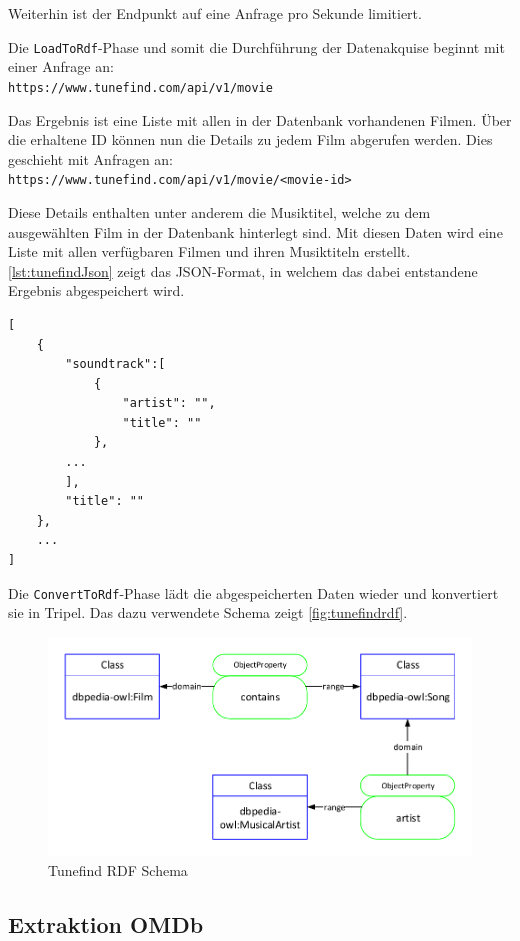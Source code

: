 \documentclass[parskip]{scrartcl}
\begin{document}
Weiterhin ist der Endpunkt auf eine Anfrage pro Sekunde limitiert.

Die \texttt{LoadToRdf}-Phase und somit die Durchführung der Datenakquise beginnt mit einer Anfrage an:\\
\texttt{https://www.tunefind.com/api/v1/movie}

Das Ergebnis ist eine Liste mit allen in der Datenbank vorhandenen Filmen. Über die erhaltene ID können nun die Details zu jedem Film abgerufen werden. Dies geschieht mit Anfragen an:\\
\texttt{https://www.tunefind.com/api/v1/movie/<movie-id>}

Diese Details enthalten unter anderem die Musiktitel, welche zu dem ausgewählten Film in der Datenbank hinterlegt sind.
Mit diesen Daten wird eine Liste mit allen verfügbaren Filmen und ihren Musiktiteln erstellt. \autoref{lst:tunefindJson} zeigt das JSON-Format, in welchem das dabei entstandene Ergebnis abgespeichert wird.

\begin{lstlisting}[caption={Tunefind JSON-Format}, label={lst:tunefindJson}]
[  
    {  
        "soundtrack":[  
            {
                "artist": "",
                "title": ""
            },
        ...
        ],
        "title": ""
    },
    ...
]
\end{lstlisting}

Die \texttt{ConvertToRdf}-Phase lädt die abgespeicherten Daten wieder und konvertiert sie in Tripel. Das dazu verwendete Schema zeigt \autoref{fig:tunefindrdf}.

\begin{figure}[H]
    \centering
    \caption{Tunefind RDF Schema}
    \label{fig:tunefindrdf}
    \includegraphics[scale=0.8]{tunefind}
\end{figure}
\subsection{Extraktion OMDb}
\end{document}
